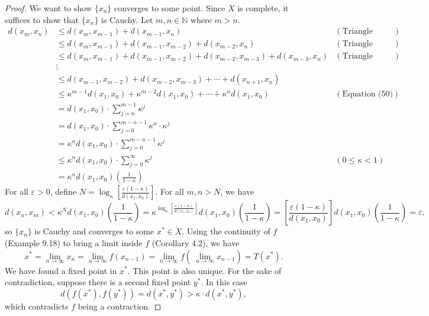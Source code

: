 \documentclass{article}
\newcommand{\N}{\mathbb{N}}
\theoremstyle{definition}
\begin{document}
\begin{proof}
		We want to show $ \{x_n\} $ converges to some point. Since $ X $ is complete, it suffices to show that $ \{x_n\}  $ is Cauchy. Let $ m,n\in\N $ where $ m > n $. 
		\begin{align*}
			d(x_m,x_n) &\le d(x_m,x_{m-1}) + d(x_{m-1}, x_n) &(\text{Triangle Inequality})\\  & \le d(x_m,x_{m-1}) + d(x_{m-1}, x_{m-2})+ d(x_{m-2}, x_n)&(\text{Triangle Inequality})\\
			  &  \le d(x_m,x_{m-1}) + d(x_{m-1}, x_{m-2})+  d(x_{m-2}, x_{m-3})+ d(x_{m-3}, x_n)&(\text{Triangle Inequality})\\ & \vdots  \\  & \le  d(x_{m-1}, x_{m-2}) +d(x_{m-2}, x_{m-3})  +  \cdots + d(x_{n+1}, x_n) \\  &\le   \kappa^{m-1}d(x_1, x_0) +  \kappa^{m-2}d(x_1, x_0) + \cdots +  \kappa^{n}d(x_1, x_0)&(\text{Equation (50)})\\ & = d(x_1,x_0)\cdot \textstyle\sum_{j=n}^{m-1}\kappa^j \\ 
			  & = d(x_1,x_0)\cdot \textstyle\sum_{j=0}^{m-n-1}\kappa^n\cdot \kappa^j \\
			  & = \kappa^nd(x_1,x_0)\cdot \textstyle\sum_{j=0}^{m-n-1}\kappa^j  \\
			  & \le \kappa^nd(x_1,x_0)\cdot \textstyle\sum_{j=0}^{\infty}\kappa^j& (0\le \kappa < 1)\\
			   & = \kappa^nd(x_1,x_0)\left(\frac{1}{1-\kappa}\right)
		\end{align*}
	For all $ \varepsilon > 0 $, define $ N = \log_\kappa\left[\frac{\varepsilon(1-\kappa)}{d(x_1,x_0)}\right] $. For all $ m,n > N $, we have 
	$$ d(x_n,x_m) < \kappa^Nd(x_1,x_0)\left(\frac{1}{1-\kappa}\right) = \kappa^{\log_\kappa\left[\frac{\varepsilon(1-\kappa)}{d(x_1,x_0)}\right] }d(x_1,x_0)\left(\frac{1}{1-\kappa}\right) = \left[\frac{\varepsilon(1-\kappa)}{d(x_1,x_0)}\right]d(x_1,x_0)\left(\frac{1}{1-\kappa}\right) = \varepsilon, $$ so $ \{x_n\} $ is Cauchy and converges to some $ x^*\in X $. Using the continuity of $ f $ (Example 9.18) to bring a limit inside $ f $ (Corollary 4.2), we have $$ x^* = \lim\limits_{n\to\infty} x_n = \lim\limits_{n\to\infty} f(x_{n-1}) = \lim\limits_{n\to\infty} f\left(\ \lim\limits_{n\to\infty} x_{n-1}\right) = T(x^*).$$ We have found a fixed point in $ x^* $. This point is also unique. For the sake of contradiction, suppose there is a second fixed point $ y^* $. In this case 
	$$d(f(x^*), f(y^*))= d(x^*, y^*) > \kappa\cdot d(x^*,y^*),$$ which contradicts $ f $ being a contraction.
	\end{proof}
\end{document}

